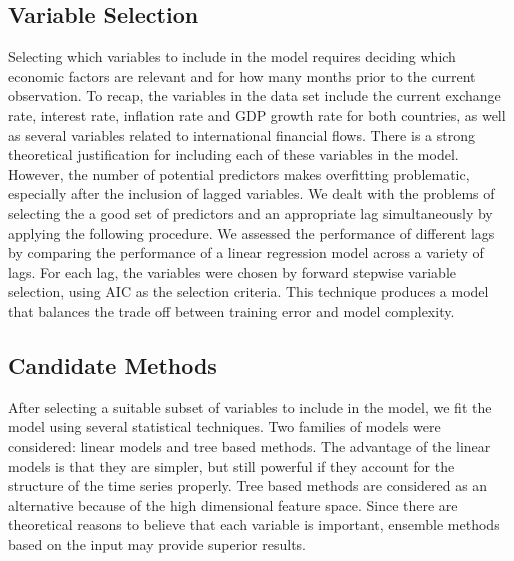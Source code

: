 \documentclass{sig-alternate-05-2015}
\begin{document}
\subsection{Variable Selection}
Selecting which variables to include in the model requires deciding which economic factors are relevant and for how many months prior to the current observation. To recap, the variables in the data set include the current exchange rate, interest rate, inflation rate and GDP growth rate for both countries, as well as several variables related to international financial flows. There is a strong theoretical justification for including each of these variables in the model. However, the number of potential predictors makes overfitting problematic, especially after the inclusion of lagged variables. We dealt with the problems of selecting the a good set of predictors and an appropriate lag simultaneously by applying the following procedure. We assessed the performance of different lags by comparing the performance of a linear regression model across a variety of lags. For each lag, the variables were chosen by forward stepwise variable selection, using AIC as the selection criteria. This technique produces a model that balances the trade off between training error and model complexity.

\subsection{Candidate Methods}
After selecting a suitable subset of variables to include in the model, we fit the model using several statistical techniques. Two families of models were considered: linear models and tree based methods. The advantage of the linear models is that they are simpler, but still powerful if they account for the structure of the time series properly. Tree based methods are considered as an alternative because of the high dimensional feature space. Since there are theoretical reasons to believe that each variable is important, ensemble methods based on the input may provide superior results.
\end{document}
